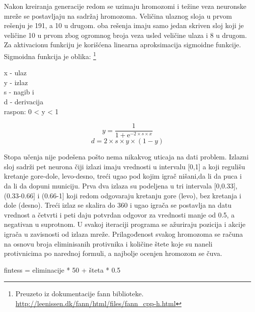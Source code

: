 \documentclass[a4paper]{article}
\begin{document}
\par Nakon kreiranja generacije redom se uzimaju hromozomi i težine veza neuronske mreže se postavljaju na sadržaj hromozoma. Veličina ulaznog sloja u prvom rešenju je 191, a 10 u drugom. oba rešenja imaju samo jedan skriven sloj koji je veličine 10 u prvom zbog ogromnog broja veza usled veličine ulaza i 8 u drugom. Za aktivacionu funkciju je korišćena linearna aproksimacija sigmoidne funkcije. Sigmoidna funkcija je oblika: \footnote{Preuzeto iz dokumentacije fann biblioteke. \url{http://leenissen.dk/fann/html/files/fann_cpp-h.html}}
\begin{tcolorbox}
\begin{center}
x - ulaz \\
y - izlaz \\ 
s - nagib i \\
d - derivacija \\
raspon: 0 < y < 1 \\
\end{center}
\begin{equation}
y = \frac{1}{1 + \mathrm{e}^{-2 \times s \times x}}
\end{equation}
\begin{equation}
d = 2 \times s \times y \times (1 - y)
\end{equation}
\end{tcolorbox}
\noindent  Stopa učenja nije podešena pošto nema nikakvog uticaja na dati problem. Izlazni sloj sadrži pet neurona čiji izlazi imaju vrednosti u intervalu [0,1] a koji regulišu kretanje gore-dole, levo-desno, treći ugao pod kojim igrač nišani,da li da puca i da li da dopuni municiju. Prva dva izlaza su podeljena u tri intervala [0,0.33], (0.33-0.66] i (0.66-1] koji redom odgovaraju kretanju gore (levo), bez kretanja i dole (desno). Treći izlaz se skalira do 360 i ugao igrača se postavlja na datu vrednost a četvrti i peti daju potvrdan odgovor za vrednosti manje od 0.5, a negativan u suprotnom. U svakoj iteraciji programa se ažuriraju pozicija i akcije igrača u zavisnosti od izlaza mreže. Prilagođenost svakog hromozoma se računa na osnovu broja eliminisanih protivnika i količine štete koje su naneli protivnicima po narednoj formuli, a najbolje ocenjen hromozom se čuva.
\begin{tcolorbox}
fintess = eliminacije * 50 + šteta * 0.5
\end{tcolorbox}
\end{document}
